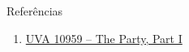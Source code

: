 \begin{frame}[fragile]{Referências}

    \begin{enumerate}
        \item \href{https://uva.onlinejudge.org/index.php?option=com_onlinejudge&Itemid=8&category=24&page=show_problem&problem=1900}{UVA 10959 -- The Party, Part I}


    \end{enumerate}

\end{frame}
